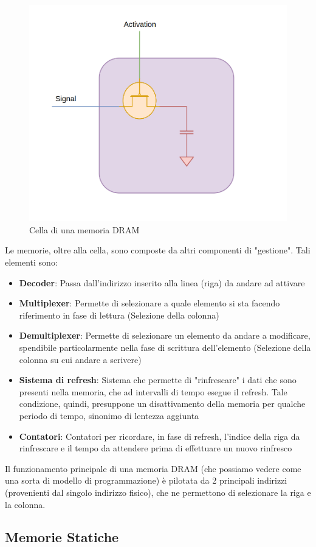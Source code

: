 \begin{figure}
    \centering
    \includegraphics[width=.3\textwidth]{img/DRAM-CELL.png}
    \caption{Cella di una memoria DRAM}\label{img:mem-dinamica}    
\end{figure}
Le memorie, oltre alla cella, sono composte da altri componenti di "gestione". Tali elementi sono:
\begin{itemize}
    \item \textbf{Decoder}: Passa dall'indirizzo inserito alla linea (riga) da andare ad attivare
    \item \textbf{Multiplexer}: Permette di selezionare a quale elemento si sta facendo riferimento in fase di lettura (Selezione della colonna)
    \item \textbf{Demultiplexer}: Permette di selezionare un elemento da andare a modificare, spendibile particolarmente nella fase di scrittura dell'elemento (Selezione della colonna su cui andare a scrivere)
    \item \textbf{Sistema di refresh}: Sistema che permette di "rinfrescare" i dati che sono presenti nella memoria, che ad intervalli di tempo esegue il refresh. Tale condizione, quindi, presuppone un disattivamento della memoria per qualche periodo di tempo, sinonimo di lentezza aggiunta
    \item \textbf{Contatori}: Contatori per ricordare, in fase di refresh, l'indice della riga da rinfrescare e il tempo da attendere prima di effettuare un nuovo rinfresco
\end{itemize}

Il funzionamento principale di una memoria DRAM (che possiamo vedere come una sorta di modello di programmazione) è pilotata da 2 principali indirizzi (provenienti dal singolo indirizzo fisico), che ne permettono di selezionare la riga e la colonna. 

\subsection{Memorie Statiche}
